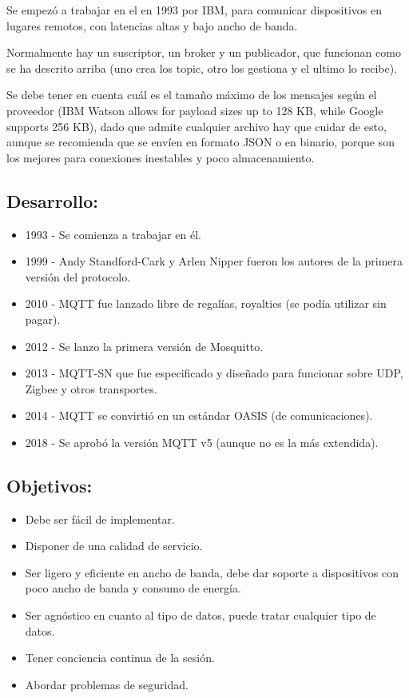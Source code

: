 \documentclass[12pt]{report} %
\begin{document}
Se empezó a trabajar en el en 1993 por IBM, para comunicar dispositivos en lugares remotos, con latencias altas y bajo ancho de banda.

Normalmente hay un suscriptor, un broker y un publicador, que funcionan como se ha descrito arriba (uno crea los topic, otro los gestiona y el ultimo lo recibe).

Se debe tener en cuenta cuál es el tamaño máximo de los mensajes según el proveedor (IBM Watson allows for payload sizes up to 128 KB, while Google supports 256 KB), dado que admite cualquier archivo hay que cuidar de esto, aunque se recomienda que se envíen en formato JSON o en binario, porque son los mejores para conexiones inestables y poco almacenamiento.

\subsection{Desarrollo:}
\begin{itemize}
	\item 1993 - Se comienza a trabajar en él.
	\item 1999 - Andy Standford-Cark y Arlen Nipper fueron los autores de la primera versión del protocolo.
	\item 2010 - MQTT fue lanzado libre de regalías, royalties (se podía utilizar sin pagar).
	\item 2012 - Se lanzo la primera versión de Mosquitto.
	\item 2013 - MQTT-SN que fue especificado y diseñado para funcionar sobre UDP, Zigbee y otros transportes.
	\item 2014 - MQTT se convirtió en un estándar OASIS (de comunicaciones).
	\item 2018 - Se aprobó la versión MQTT v5 (aunque no es la más extendida).
\end{itemize}

\subsection{Objetivos:}
\begin{itemize}
	\item Debe ser fácil de implementar.
	\item Disponer de una calidad de servicio.
	\item Ser ligero y eficiente en ancho de banda, debe dar soporte a dispositivos con poco ancho de banda y consumo de energía.
	\item Ser agnóstico en cuanto al tipo de datos, puede tratar cualquier tipo de datos.
	\item Tener conciencia continua de la sesión.
	\item Abordar problemas de seguridad.
\end{itemize}
\end{document}
